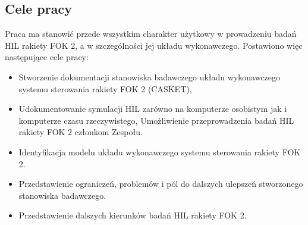 \subsection{Cele pracy}
Praca ma stanowić przede wszystkim charakter użytkowy w prowadzeniu badań HIL rakiety FOK 2, a w szczególności jej układu wykonawczego.
Postawiono więc następujące cele pracy:
\begin{itemize}
    \item Stworzenie dokumentacji stanowiska badawczego układu wykonawczego systemu sterowania rakiety FOK 2 (CASKET),
    \item Udokumentowanie symulacji HIL zarówno na komputerze osobistym jak i komputerze czasu rzeczywistego,
    Umożliwienie przeprowadzenia badań HIL rakiety FOK 2 członkom Zespołu.
    \item Identyfikacja modelu układu wykonawczego systemu sterowania rakiety FOK 2.
    \item Przedstawienie ograniczeń, problemów i pól do dalszych ulepszeń stworzonego stanowiska badawczego.
    \item Przedstawienie dalszych kierunków badań HIL rakiety FOK 2.
\end{itemize}